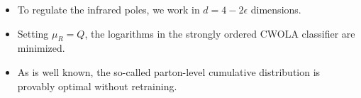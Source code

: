 \begin{itemize}
  \item To regulate the infrared poles, we work in $d = 4 - 2\epsilon$ dimensions.
  \item Setting $\mu_R = Q$, the logarithms in the strongly ordered CWOLA classifier are minimized.
  \item As is well known, the so-called parton-level cumulative distribution is provably optimal without retraining.
\end{itemize}

